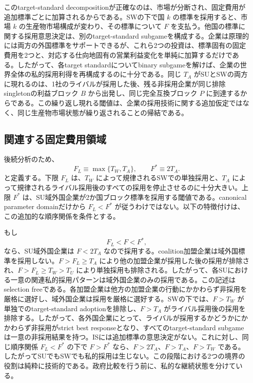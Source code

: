 このtarget-standard decompositionが正確なのは、市場が分断され、固定費用が追加標準ごとに加算されるからである。SWの下で国 $k$ の標準を採用すると、市場 $k$ の生産物市場構成が変わり、その標準について $F$ を支払う。他国の標準に関する採用意思決定は、別のtarget-standard subgameを構成する。企業は原理的には両方の外国標準をサポートできるが、これら2つの投資は、標準固有の固定費用を2つと、対応する仕向地固有の営業利益変化を単純に加算するだけである。したがって、各target standardについてbinary subgameを解けば、企業の世界全体の私的採用利得を再構成するのに十分である。同じ $T_A$ がSUとSWの両方に現れるのは、1社のライバルが採用した後、残る非採用企業が同じ排除singletonの利益ブロック $B$ から出発し、同じ完全互換ブロック $P$ に到達するからである。この繰り返し現れる閾値は、企業の採用技術に関する追加仮定ではなく、同じ生産物市場状態が繰り返されることの帰結である。

\subsection{関連する固定費用領域}
\label{subsec:private-regions}

後続分析のため、
\begin{equation}
    F_L\equiv\max\{T_W,T_A\},
    \qquad
    F^\ast\equiv2T_A.
    \label{eq:private-F-boundaries}
\end{equation}
と定義する。下限 $F_L$ は、$T_W$ によって規律されるSWでの単独採用と、$T_A$ によって規律されるライバル採用後のすべての採用を停止させるのに十分大きい。上限 $F^\ast$ は、SU域外国企業が2か国ブロック標準を採用する閾値である。canonical parameter domainだけから $F_L<F^\ast$ が従うわけではない。以下の特徴付けは、この追加的な順序関係を条件とする。

もし
\begin{equation}
    F_L<F<F^\ast,
    \label{eq:intermediate-F-region}
\end{equation}
なら、SU域外国企業は $F<2T_A$ なので採用する。coalition加盟企業は域外国標準を採用しない。$F>F_L\ge T_A$ により他の加盟企業が採用した後の採用が排除され、$F>F_L\ge T_W>T_U$ により単独採用も排除される。したがって、各SUにおける一意の関連私的採用パターンは域外国企業のみの採用である。この記述はselection freeである。各加盟企業は他方の加盟企業の行動にかかわらず非採用を厳格に選好し、域外国企業は採用を厳格に選好する。SWの下では、$F>T_W$ が単独でのtarget-standard adoptionを排除し、$F>T_A$ がライバル採用後の採用を排除する。したがって、各外国企業にとって、ライバルが採用するかどうかにかかわらず非採用がstrict best responseとなり、すべてのtarget-standard subgameは一意の非採用結果を持つ。ISには追加標準の意思決定がない。これに対し、同じ順序関係 $F_L<F^\ast$ の下で $F>F^\ast$ なら、$F>2T_A$、$F>T_A$、$F>T_W$ である。したがってSUでもSWでも私的採用は生じない。この段階における2つの境界の役割は純粋に技術的である。政府比較を行う前に、私的な継続状態を分けている。

